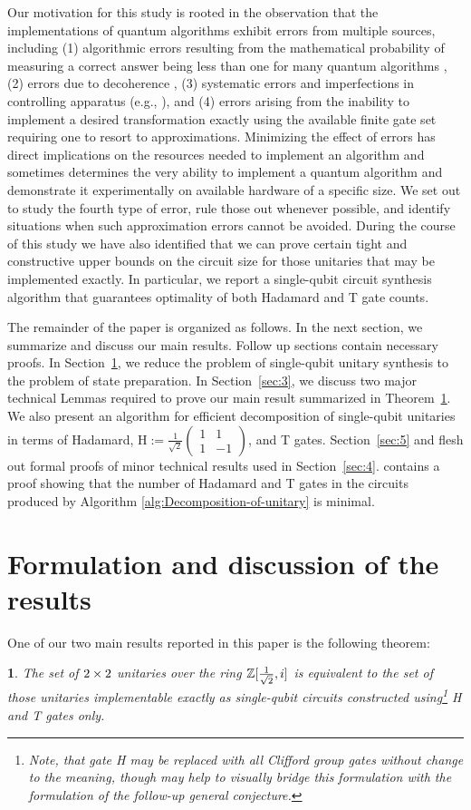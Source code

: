 \documentclass[english,journal]{extarticle}
\theoremstyle{plain}
\newtheorem{thm}{\protect\theoremname}
\theoremstyle{plain}
\theoremstyle{plain}
\theoremstyle{definition}
\theoremstyle{plain}
\theoremstyle{plain}
\providecommand{\theoremname}{\inputencoding{latin9}Theorem}
\begin{document}
Our motivation for this study is rooted in the observation that the
implementations of quantum algorithms exhibit errors from multiple sources, including (1) algorithmic
errors resulting from the mathematical probability of measuring a correct answer being less
than one for many quantum algorithms \cite{bk:nc}, (2) errors due to
decoherence \cite{bk:nc}, (3) systematic errors and imperfections in controlling
apparatus (e.g., \cite{ar:clj}), and (4) errors arising from the inability to
implement a desired transformation exactly using the available finite gate set requiring one to resort to
approximations.  Minimizing the effect of errors has direct implications on the resources needed to implement an algorithm and sometimes determines the very ability to implement a quantum
algorithm and demonstrate it experimentally on available hardware of a specific size.  We set out to study the fourth
type of error, rule those out whenever possible, and identify situations when
such approximation errors cannot be avoided.  During the course of this study we have
also identified that we can prove certain tight and constructive upper bounds on the circuit size
for those unitaries that may be implemented exactly.  In particular, we report a single-qubit circuit 
synthesis algorithm that guarantees optimality of both Hadamard and T gate counts.

The remainder of the paper is organized as follows.  In the next section, 
we summarize and discuss our main results.  Follow up sections contain necessary
proofs. 
In Section~\ref{sec:2}, we reduce the problem of single-qubit unitary synthesis
to the problem of state preparation. 
In Section~\ref{sec:3}, we discuss two major technical Lemmas
required to prove our main result summarized in Theorem~\ref{thm:main}.  We also
present an algorithm for efficient decomposition of single-qubit unitaries
in terms of Hadamard, H$:=\frac{1}{\sqrt{2}}\left(\begin{array}{cc}
1 & 1\\
1 & -1
\end{array}\right)$, and T gates.  Section~\ref{sec:5} and  flesh out
formal proofs of minor technical results
used in Section~\ref{sec:4}.  contains a proof
showing that the
number of Hadamard and T gates in the circuits produced by Algorithm
\ref{alg:Decomposition-of-unitary} is minimal.

\section{Formulation and discussion of the results} \label{sec:2}
\noindent
One of our two main results reported in this paper is the following theorem:
\begin{thm} \label{thm:main}
The set of $2\times 2$ unitaries over the ring $\mathbb{Z}[\frac{1}{\sqrt{2}},i]$ is equivalent to the set of
those unitaries implementable exactly as single-qubit circuits constructed
using\footnote{ Note, that gate H may be replaced with all Clifford group gates
without change to the meaning, though may help to visually bridge this
formulation with 
the formulation of the follow-up general conjecture.} H and T gates only. 
\end{thm}
\end{document}
